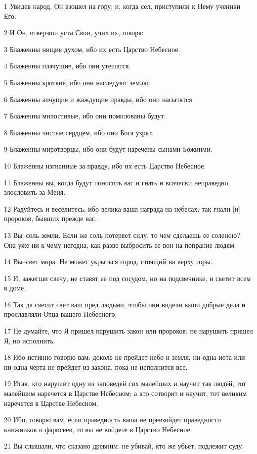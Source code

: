 \par 1 Увидев народ, Он взошел на гору; и, когда сел, приступили к Нему ученики Его.
\par 2 И Он, отверзши уста Свои, учил их, говоря:
\par 3 Блаженны нищие духом, ибо их есть Царство Небесное.
\par 4 Блаженны плачущие, ибо они утешатся.
\par 5 Блаженны кроткие, ибо они наследуют землю.
\par 6 Блаженны алчущие и жаждущие правды, ибо они насытятся.
\par 7 Блаженны милостивые, ибо они помилованы будут.
\par 8 Блаженны чистые сердцем, ибо они Бога узрят.
\par 9 Блаженны миротворцы, ибо они будут наречены сынами Божиими.
\par 10 Блаженны изгнанные за правду, ибо их есть Царство Небесное.
\par 11 Блаженны вы, когда будут поносить вас и гнать и всячески неправедно злословить за Меня.
\par 12 Радуйтесь и веселитесь, ибо велика ваша награда на небесах: так гнали [и] пророков, бывших прежде вас.
\par 13 Вы--соль земли. Если же соль потеряет силу, то чем сделаешь ее соленою? Она уже ни к чему негодна, как разве выбросить ее вон на попрание людям.
\par 14 Вы--свет мира. Не может укрыться город, стоящий на верху горы.
\par 15 И, зажегши свечу, не ставят ее под сосудом, но на подсвечнике, и светит всем в доме.
\par 16 Так да светит свет ваш пред людьми, чтобы они видели ваши добрые дела и прославляли Отца вашего Небесного.
\par 17 Не думайте, что Я пришел нарушить закон или пророков: не нарушить пришел Я, но исполнить.
\par 18 Ибо истинно говорю вам: доколе не прейдет небо и земля, ни одна иота или ни одна черта не прейдет из закона, пока не исполнится все.
\par 19 Итак, кто нарушит одну из заповедей сих малейших и научит так людей, тот малейшим наречется в Царстве Небесном; а кто сотворит и научит, тот великим наречется в Царстве Небесном.
\par 20 Ибо, говорю вам, если праведность ваша не превзойдет праведности книжников и фарисеев, то вы не войдете в Царство Небесное.
\par 21 Вы слышали, что сказано древним: не убивай, кто же убьет, подлежит суду.
